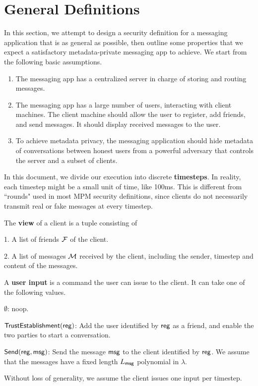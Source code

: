 \newcommand{\Leak}{\mathsf{Leak}}
\section{General Definitions}

In this section, we attempt to design a security definition for a messaging application that is as general as possible, then outline some properties that we expect a satisfactory metadata-private messaging app to achieve. We start from the following basic assumptions.
\begin{enumerate}
    \item The messaging app has a centralized server in charge of storing and routing messages.
    \item The messaging app has a large number of users, interacting with client machines. The client machine should allow the user to register, add friends, and send messages. It should display received messages to the user.
    \item To achieve metadata privacy, the messaging application should hide metadata of conversations between honest users from a powerful adversary that controls the server and a subset of clients. 
\end{enumerate}
\begin{definition}
In this document, we divide our execution into discrete \textbf{timesteps}. In reality, each timestep might be a small unit of time, like 100ms. This is different from ``rounds" used in most MPM security definitions, since clients do not necessarily transmit real or fake messages at every timestep.
\end{definition}
\begin{definition}
The \textbf{view} of a client is a tuple consisting of

1. A list of friends $\mathcal{F}$ of the client.

2. A list of messages $\mathcal{M}$ received by the client, including the sender, timestep and content of the messages. 
\end{definition}
\begin{definition}
A \textbf{user input} is a command the user can issue to the client. It can take one of the following values.

$\emptyset$: noop.

$\mathsf{TrustEstablishment}(\mathsf{reg})$: Add the user identified by $\mathsf{reg}$ as a friend, and enable the two parties to start a conversation.

$\mathsf{Send}(\mathsf{reg}, \mathsf{msg})$: Send the message $\mathsf{msg}$ to the client identified by $\mathsf{reg}$. We assume that the messages have a fixed length $L_{\mathsf{msg}}$ polynomial in $\lambda$.

Without loss of generality, we assume the client issues one input per timestep.
\end{definition}

